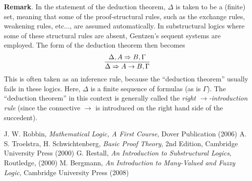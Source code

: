 \documentclass[12pt]{article}
\begin{document}
\textbf{Remark}.  In the statement of the deduction theorem, $\Delta$ is taken to be a (finite) set, meaning that some of the proof-structural rules, such as the exchange rules, weakening rules, etc..., are assumed automatically.  In substructural logics where some of these structural rules are absent, Gentzen's sequent systems are employed.  The form of the deduction theorem then becomes 
$${\Delta,A \Rightarrow B,\Gamma \over \Delta \Rightarrow A\to B,\Gamma}$$
This is often taken as an inference rule, because the ``deduction theorem'' usually fails in these logics.  Here, $\Delta$ is a finite sequence of formulas (as is $\Gamma$).  The ``deduction theorem'' in this context is generally called the \emph{right $\to$-introduction rule} (since the connective $\to$ is introduced on the right hand side of the succedent).

\begin{thebibliography}{7}
 J. W. Robbin, {\it Mathematical Logic, A First Course}, Dover Publication (2006)
 A. S. Troelstra, H. Schwichtenberg, {\it Basic Proof Theory}, 2nd Edition, Cambridge University Press (2000)
 G. Restall, {\it An Introduction to Substructural Logics}, Routledge, (2000)
 M. Bergmann, {\it An Introduction to Many-Valued and Fuzzy Logic}, Cambridge University Press (2008)
\end{thebibliography}

\end{document}
